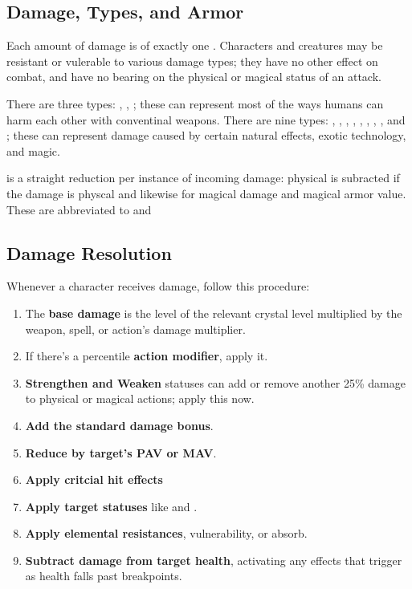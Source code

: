\begin{multicols}{2}
    \subsection{Damage, Types, and Armor}
        Each amount of damage is of exactly one . Characters and creatures may be resistant or vulerable to various damage types; they have no other effect on combat, and have no bearing on the physical or magical status of an attack.

        There are three  types: , , ; these can represent most of the ways humans can harm each other with conventinal weapons. There are nine  types: , , , , , , , , and ;  these can represent damage caused by certain natural effects, exotic technology, and magic.

         is a straight reduction per instance of incoming damage: physical  is subracted if the damage is physcal and likewise for magical damage and magical armor value. These are abbreviated to  and 
        \clearpage
    \subsection{Damage Resolution}
        Whenever a character receives damage, follow this procedure:

        \begin{enumerate}
            \item The \textbf{base damage} is the level of the relevant crystal level multiplied by the weapon, spell, or action's damage multiplier.

            \item If there's a percentile \textbf{action modifier}, apply it.

            \item \textbf{Strengthen and Weaken} statuses can add or remove another 25\% damage to physical or magical actions; apply this now.

            \item \textbf{Add the standard damage bonus}.
            \item \textbf{Reduce by target's PAV or MAV}.        
            \item \textbf{Apply critcial hit effects}
            \item \textbf{Apply target statuses} like  and .
            \item \textbf{Apply elemental resistances}, vulnerability, or absorb.
            \item \textbf{Subtract damage from target health}, activating any effects that trigger as health falls past breakpoints.
        \end{enumerate}


\end{multicols}
